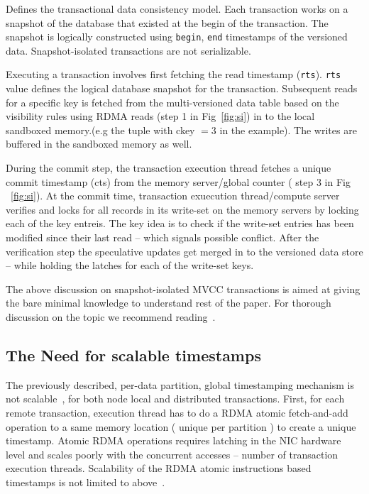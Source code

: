 Defines the transactional data consistency model. Each transaction 
works on a snapshot of the database that
existed at the begin of the transaction. The snapshot is logically 
constructed using \texttt{begin}, \texttt{end} timestamps of the
versioned data. Snapshot-isolated transactions are not serializable.

Executing a transaction involves first fetching the read timestamp (\texttt{rts}). 
\texttt{rts} value defines the logical database
snapshot for the transaction. Subsequent reads for a specific key is 
fetched from the multi-versioned data table
based on the visibility rules using RDMA reads (step 1 in Fig~\ref{fig:si}) in 
to the local sandboxed memory.(e.g the tuple with ckey $=3$ in
the example). The writes are buffered in the sandboxed memory as well. 

During the commit step, the transaction execution thread fetches a unique commit timestamp (cts)
from the memory server/global counter ( step 3 in Fig ~\ref{fig:si}). At the commit time, 
transaction exuecution thread/compute server verifies and locks for all records in its write-set on
the memory servers by locking each of the key entreis. The key idea is to check if the write-set
entries has been modified since their last read -- which signals possible conflict. After the verification
step the speculative updates get merged in to the versioned data store -- while holding the latches
for each of the write-set keys.

The above discussion on snapshot-isolated MVCC transactions is aimed at giving the bare minimal
knowledge to understand rest of the paper. For thorough discussion on the topic we recommend reading~\cite{namdb}.

\subsection{The Need for scalable timestamps}

The previously described, per-data partition,
global timestamping mechanism is not scalable~\cite{rethinking},
for both node local and distributed transactions.
First, for each remote transaction, execution thread has to do a RDMA atomic fetch-and-add 
operation to a same memory location ( unique per partition ) to create a unique timestamp.
Atomic RDMA operations requires latching in the NIC hardware level and scales poorly with the
concurrent accesses -- number of transaction execution threads.
Scalability of the RDMA atomic instructions based timestamps is not limited to above~\cite{namdb}.


